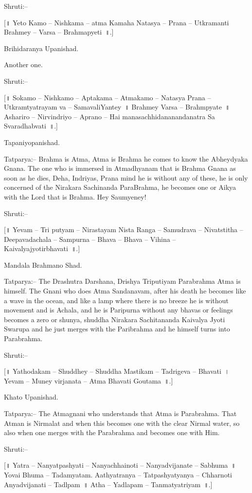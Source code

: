 Shruti:–

[॥ Yeto Kamo – Nishkama – atma Kamaha Natasya – Prana – Utkramanti Brahmey – Varsa – Brahmapyeti~॥.]

Brihidaranya Upanishad.

Another one.

Shruti:–

[॥ Sokamo – Nishkamo – Aptakama – Atmakamo – Natasya Prana – Utkramtyatrayam va – SamavaliYantey~॥ Brahmey Varsa – Brahmpyate~॥ Ashariro – Nirvindriyo – Aprano – Hai manasachhidananandanatra Sa Svaradhabvati~॥.]

Tapaniyopanishad.

Tatparya:– Brahma is Atma, Atma is Brahma he comes to know the Abheydyaka Gnana. The one who is immersed in Atmadhyanam that is Brahma Gnana as soon as he dies, Deha, Indriyas, Prana mind he is without any of these, he is only concerned of the Nirakara Sachinanda ParaBrahma, he becomes one or Aikya with the Lord that is Brahma. Hey Saumyeney!

Shruti:–

[॥ Yevam – Tri putyam – Nirastayam Nista Ranga – Samudrava – Nivatstitha – Deepavadachala – Sampurna – Bhava – Bhava – Vihina – Kaivalyajyotirbhavati~॥.]

Mandala Brahmano Shad.

Tatparya:– The Drashutra Darshana, Drishya Triputiyam Parabrahma Atma is himself. The Gnani who does Atma Sandanavam, after his death he becomes like a wave in the ocean, and like a lamp where there is no breeze he is without movement and is Achala, and he is Paripurna without any bhavas or feelings becomes a zero or shunya, shuddha Nirakara Sachitananda Kaivalya Jyoti Swarupa and he just merges with the Paribrahma and he himself turns into Parabrahma.

Shruti:–

[॥ Yathodakam – Shuddhey – Shuddha Mastikam – Tadrigeva – Bhavati~। Yevam – Muney virjanata – Atma Bhavati Goutama~॥.]

Khato Upanishad.

Tatparya:– The Atmagnani who understands that Atma is Parabrahma. That Atman is Nirmalat and when this becomes one with the clear Nirmal water, so also when one merges with the Parabrahma and becomes one with Him.

Shruti:–

[॥ Yatra – Nanyatpashyati – Nanyachhainoti – Nanyadvijanate – Sabhuma~॥ Yovai Bhuma – Tadamyatam. Aathyatranya – Tatpashyatyanya – Chharnoti Anyadvijanati – Tadlpam~॥ Atha – Yadlapam – Tanmatyatriyam~॥.]

